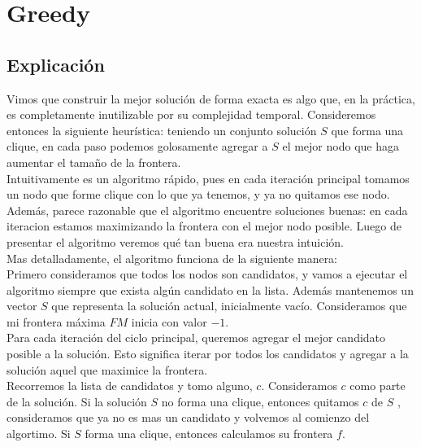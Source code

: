 
\section{Greedy}

\subsection{Explicación}

Vimos que construir la mejor solución de forma exacta es algo que, en la práctica, es completamente inutilizable por su complejidad temporal. Consideremos entonces la siguiente heurística: teniendo un conjunto solución $S$ que forma una clique, en cada paso podemos golosamente agregar a $S$ el mejor nodo que haga aumentar el tamaño de la frontera. \\

Intuitivamente es un algoritmo rápido, pues en cada iteración principal tomamos un nodo que forme clique con lo que ya tenemos, y ya no quitamos ese nodo. Además, parece razonable que el algoritmo encuentre soluciones buenas: en cada iteracion estamos maximizando la frontera con el mejor nodo posible. Luego de presentar el algoritmo veremos qué tan buena era nuestra intuición. \\

Mas detalladamente, el algoritmo funciona de la siguiente manera: \\

Primero consideramos que todos los nodos son candidatos, y vamos a ejecutar el algoritmo siempre que exista algún candidato en la lista. Además mantenemos un vector $S$ que representa la solución actual, inicialmente vacío. Consideramos que mi frontera máxima $FM$ inicia con valor $-1$. \\

Para cada iteración del ciclo principal, queremos agregar el mejor candidato posible a la solución. Esto significa iterar por todos los candidatos y agregar a la solución aquel que maximice la frontera. \\

Recorremos la lista de candidatos y tomo alguno, $c$. Consideramos $c$ como parte de la solución. Si la solución $S$ no forma una clique, entonces quitamos $c$ de $S$ , consideramos que ya no es mas un candidato y volvemos al comienzo del algortimo. Si $S$ forma una clique, entonces calculamos su frontera $f$. \\

